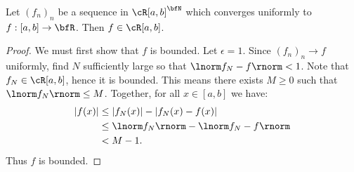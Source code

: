 \documentclass[10pt,twoside,openany]{memoir}
\begin{document}
    \begin{proposition}
        Let $(f_n)_n$ be a sequence in $\cR[a,b]^\bfN$ which converges uniformly to $f:[a,b] \rightarrow \bfR$. Then $f \in \cR[a,b]$.
    \end{proposition}
        \begin{proof}
            We must first show that $f$ is bounded. Let $\epsilon = 1$. Since $(f_n)_n \rightarrow f$ uniformly, find $N$ sufficiently large so that $\lnorm f_N - f \rnorm < 1$. Note that $f_N \in \cR[a,b]$, hence it is bounded. This means there exists $M \geq 0$ such that $\lnorm f_N \rnorm \leq M$. Together, for all $x \in [a,b]$ we have:
                \begin{equation*}
                \begin{split}
                    |f(x)| 
                    &\leq |f_N(x)| - |f_N(x) - f(x)| \\
                    & \leq \lnorm f_N \rnorm - \lnorm f_N - f \rnorm \\
                    & < M - 1.
                \end{split}
                \end{equation*}
            Thus $f$ is bounded.


\end{proof}
\end{document}

